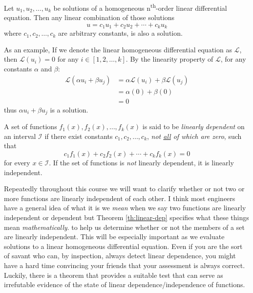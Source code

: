 \begin{theorem}
Let $u_1,u_2,\dots,u_k$ be solutions of a homogeneous n\textsuperscript{th}-order linear differential equation.  Then any linear combination of those solutions 
$$u = c_1u_1+c_2u_2+\cdots+c_ku_k$$where $c_1,c_2,\dots,c_k$ are arbitrary constants, is also a solution.
\end{theorem}
As an example, If we denote the linear homogeneous differential equation as $\mathcal{L}$, then $\mathcal{L}(u_i) = 0$ for any $i \in [1,2,\dots,k]$.  By the linearity property of $\mathcal{L}$, for any constants $\alpha$ and $\beta$:
\begin{align*}
\mathcal{L}(\alpha u_i + \beta u_j) &=  \alpha \mathcal{L}(u_i) + \beta \mathcal{L}(u_j)\\
&= \alpha(0) + \beta(0) \\
&= 0
\end{align*}
thus $\alpha u_i + \beta u_j$ is a solution.

\begin{theorem}
A set of functions $f_1(x),f_2(x),\dots,f_k(x)$ is said to be \emph{linearly dependent} on an interval $\mathcal{I}$ if there exist constants $c_1,c_2,\dots,c_k$, \emph{not \underline{all} of which are zero}, such that
$$c_1f_1(x) + c_2f_2(x)+\cdots+c_kf_k(x) = 0$$
\noindent for every $x \in \mathcal{I}$.  If the set of functions is \emph{not} linearly dependent, it is linearly independent.
\label{th:linear-dep}
\end{theorem} 
Repeatedly throughout this course we will want to clarify whether or not two or more functions are linearly independent of each other.  I think most engineers have a general idea of what it is we \emph{mean} when we say two functions are linearly independent or dependent but Theorem \ref{th:linear-dep} specifies what these things mean \emph{mathematically}.  
 to help us determine whether or not the members of a set are linearly independent. This will be especially important as we evaluate solutions to a linear homogeneous differential equation.  Even if you are the sort of savant who can, by inspection, always detect linear dependence, you might have a hard time convincing your friends that your assessment is always correct.  Luckily, there is a theorem that provides a suitable test that can serve as irrefutable evidence of the state of linear dependence/independence of functions.

